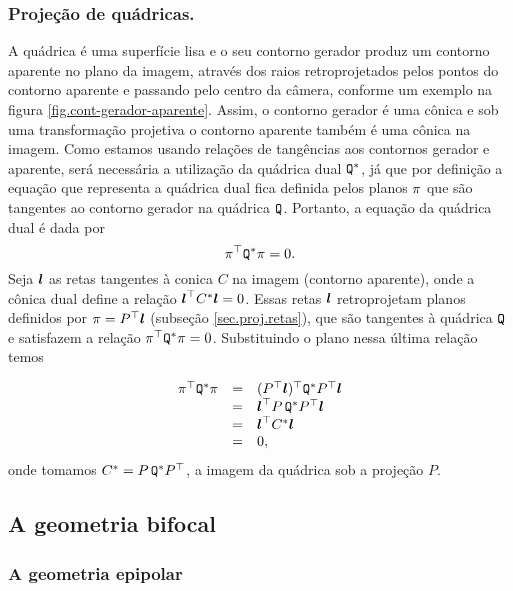 \subsubsection*{Projeção de quádricas.}
A quádrica é uma superfície lisa  e o seu contorno gerador produz um contorno aparente no plano da imagem, através dos raios retroprojetados pelos pontos do contorno aparente e passando pelo centro da câmera, conforme um exemplo na figura \ref{fig.cont-gerador-aparente}. Assim, o contorno gerador é uma cônica e sob uma transformação projetiva o contorno aparente também é uma cônica na imagem. Como estamos usando relações de tangências aos contornos gerador e aparente, será necessária a utilização da quádrica dual	${\tt Q}^*$, já que por definição a equação que representa a quádrica dual fica definida pelos planos $\pi$ que são tangentes ao contorno gerador na quádrica ${\tt Q}$. Portanto, a equação da quádrica dual é dada por
\begin{equation*}
\pi^\top {\tt Q}^*\pi=0.
\end{equation*}
Seja $\boldsymbol{l}$ as retas tangentes à conica $C$ na imagem (contorno aparente), onde a cônica dual define a relação $\boldsymbol{l}^\top C^*\boldsymbol{l}=0$. Essas retas $\boldsymbol{l}$ retroprojetam planos definidos por $\pi=P^\top\boldsymbol{l}$ (subseção \ref{sec.proj.retas}), que são tangentes à quádrica ${\tt Q}$ e satisfazem a relação $\pi^\top {\tt Q}^*\pi=0$. Substituindo o plano nessa última relação temos

\begin{equation*}
\begin{array}{rcl}
\pi^\top {\tt Q}^*\pi&=&(P^\top\boldsymbol{l})^\top {\tt Q}^*P^\top\boldsymbol{l}\\
&=&\boldsymbol{l}^\top P\,{\tt Q}^*P^\top\boldsymbol{l}\\
&=&\boldsymbol{l}^\top C^*\boldsymbol{l}\\
&=&0,
\end{array}
\end{equation*}
onde tomamos $C^*=P\,{\tt Q}^*P^\top$, a imagem da quádrica sob a projeção $P$.

\subsection{A geometria bifocal}

\subsubsection*{A geometria epipolar}

